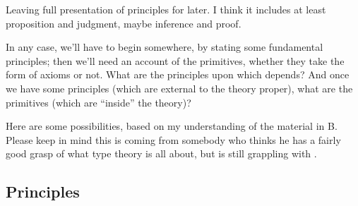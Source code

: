 \begin{ednote}
  Leaving full presentation of principles for later.  I think it
  includes at least proposition and judgment, maybe inference and
  proof.
\end{ednote}

In any case, we'll have to begin somewhere, by stating some
fundamental principles; then we'll need an account of the primitives,
whether they take the form of axioms or not.  What are the principles
upon which \HoTT{} depends?  And once we have some principles (which are
external to the theory proper), what are the primitives (which are
``inside'' the theory)?

Here are some possibilities, based on my understanding of the material
in \HoTT{}B.  Please keep in mind this is coming from somebody who
thinks he has a fairly good grasp of what type theory is all about,
but is still grappling with \HoTT{}.

\subsection{\HoTT{} Principles}
\label{subs:hottprinciples}

